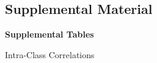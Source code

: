\clearpage
\makeatletter
\efloat@restorefloats
\makeatother


\begin{appendix}
\renewcommand{\appendixname}{\textcolor{white}{.}}
\renewcommand{\thefigure}{S\arabic{figure}} \setcounter{figure}{0}
\renewcommand{\thetable}{S\arabic{table}} \setcounter{table}{0}

\setcounter{page}{1}

\hypertarget{supplemental-material}{%
\section{Supplemental Material}\label{supplemental-material}}

\noindent \textbf{Supplemental Tables}

\begin{table}[h]

\begin{center}
\begin{threeparttable}

\caption{\label{tab:icc-table}Intra-Class Correlations}


\end{threeparttable}
\end{center}
\end{table}
\end{appendix}

